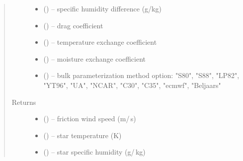 \documentclass[letterpaper,10pt,english]{sphinxmanual}
\begin{document}
\begin{fulllineitems}
\begin{quote}
\begin{description}
\begin{itemize}
\item {} 
(\href{https://docs.python.org/3/library/functions.html\#float}{}) -- specific humidity difference (g/kg)

\item {} 
(\href{https://docs.python.org/3/library/functions.html\#float}{}) -- drag coefficient

\item {} 
(\href{https://docs.python.org/3/library/functions.html\#float}{}) -- temperature exchange coefficient

\item {} 
(\href{https://docs.python.org/3/library/functions.html\#float}{}) -- moisture exchange coefficient

\item {} 
(\href{https://docs.python.org/3/library/functions.html\#str}{}) -- bulk parameterization method option: "S80", "S88", "LP82", "YT96", "UA", "NCAR", "C30", "C35", "ecmwf", "Beljaars"
\end{itemize}

\item[{Returns}] \leavevmode
\begin{itemize}
\item {} 
(\href{https://docs.python.org/3/library/functions.html\#float}{}) -- friction wind speed (m\slash\,s)

\item {} 
(\href{https://docs.python.org/3/library/functions.html\#float}{}) -- star temperature (K)

\item {} 
(\href{https://docs.python.org/3/library/functions.html\#float}{}) -- star specific humidity (g\slash\,kg)
\end{itemize}
\end{description}\end{quote}

\end{fulllineitems}

\end{document}
